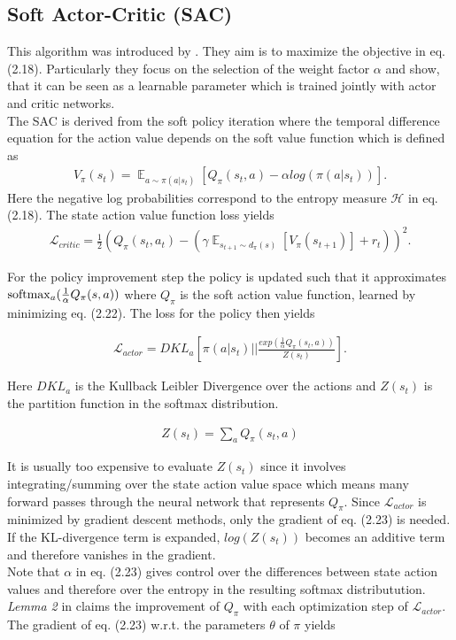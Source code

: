 \subsection{Soft Actor-Critic (SAC)}\label{ssec:sac}
This algorithm was introduced by \cite{haarnoja2018soft}. They aim is to maximize the objective in eq. (2.18). Particularly they focus on the selection of the weight factor $\alpha$ and show, that it can be seen as a learnable parameter which is trained jointly with actor and critic networks.\\
The SAC is derived from the soft policy iteration where the temporal difference equation for the action value depends on the soft value function which is defined as
\begin{align}
	V_{\pi}(s_t) = \mathop{\mathbb{E}}_{a \sim \pi(a|s_t)} \left[ Q_{\pi}(s_t, a) - \alpha log( \pi(a|s_t)) \right].
\end{align}
Here the negative log probabilities correspond to the entropy measure $\mathcal{H}$ in eq. (2.18). The state action value function loss yields
\begin{align}
	\mathcal{L}_{critic} = \frac{1}{2}(Q_{\pi}(s_t, a_t) - (\gamma \mathop{\mathbb{E}}_{s_{t+1} \sim d_{\pi}(s)} \left[ V_{\pi}(s_{t+1})\right] + r_t)) ^ 2.
\end{align}

For the policy improvement step the policy is updated such that it approximates $\operatorname*{softmax}_a(\frac{1}{\alpha}Q_{\pi}(s, a))$ where $Q_{\pi}$ is the soft action value function, learned by minimizing eq. (2.22). The loss for the policy then yields

\begin{align}
\mathcal{L}_{actor} = DKL_{a}\left[ \pi(a| s_t) \bigg|\bigg| \frac{exp(\frac{1}{\alpha} Q_{\pi}(s_t, a))}{Z(s_t)} \right].
\end{align}

Here $DKL_{a}$ is the Kullback Leibler Divergence over the actions and $Z(s_t)$ is the partition function in the softmax distribution. 

\begin{align}
	Z(s_t) = \sum_a Q_{\pi} (s_t, a)
\end{align}

It is usually too expensive to evaluate $Z(s_t)$ since it involves integrating/summing over the state action value space which means many forward passes through the neural network that represents $Q_{\pi}$. Since $\mathcal{L}_{actor}$ is minimized by gradient descent methods, only the gradient of eq. (2.23) is needed. If the KL-divergence term is expanded, $log(Z(s_t))$ becomes an additive term and therefore vanishes in the gradient.\\
Note that $\alpha$ in eq. (2.23) gives control over the differences between state action values and therefore over the entropy in the resulting softmax distributution. \emph{Lemma 2} in \cite{haarnoja2018soft} claims the improvement of $Q_{\pi}$ with each optimization step of $\mathcal{L}_{actor}$.\\
The gradient of eq. (2.23) w.r.t. the parameters $\theta$ of $\pi$ yields

